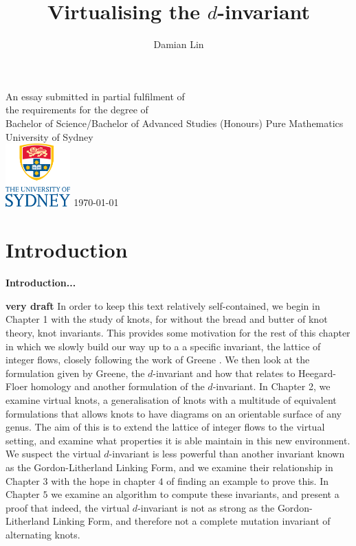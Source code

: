 \documentclass[12pt]{report}
\newcommand{\notered}[1]{{\color{Red} \textbf{#1}}}
\newcommand{\notegreen}[1]{{\color{Green} \textbf{#1}}}
\begin{document}
	

\author{Damian Lin}
\title{Virtualising the $d$-invariant}

\cleardoublepage \thispagestyle{empty}
\null \vfil
\begingroup
\LARGE \bfseries \centering
\openup \medskipamount
\thetitle \par \vspace{30pt}
\centering \mdseries \theauthor \par \bigskip
\endgroup
\vfil \vfil \vfil
\begin{center}
	An essay submitted in partial fulfilment of\\
	the requirements for the degree of\\
	Bachelor of Science/Bachelor of Advanced Studies (Honours)
	\vfil\vfil
	{\large Pure Mathematics\\[5pt]
		University of Sydney}\\
	\vskip6mm
	\includegraphics[width=25mm]{graphics/USY_MB1_CMYK_Stacked_Logo}
	\vfil
	\normalsize\today
\end{center}
\vfil
\cleardoublepage

\tableofcontents

\chapter*{Introduction}

\notegreen{Introduction...}

\notered{very draft}
In order to keep this text relatively self-contained, we begin in Chapter 1 with the study of knots, for without the bread and butter of knot theory, knot invariants. This provides some motivation for the rest of this chapter in which we slowly build our way up to a a specific invariant, the lattice of integer flows, closely following the work of Greene \cite{lattices-graphs-mutation}. We then look at the formulation given by Greene, the $d$-invariant and how that relates to Heegard-Floer homology and another formulation of the $d$-invariant. In Chapter 2, we examine virtual knots, a generalisation of knots with a multitude of equivalent formulations that allows knots to have diagrams on an orientable surface of any genus. The aim of this is to extend the lattice of integer flows to the virtual setting, and examine what properties it is able maintain in this new environment. We suspect the virtual $d$-invariant is less powerful than another invariant known as the Gordon-Litherland Linking Form, and we examine their relationship in Chapter $3$ with the hope in chapter $4$ of finding an example to prove this. In Chapter $5$ we examine an algorithm to compute these invariants, and present a proof that indeed, the virtual $d$-invariant is not as strong as the Gordon-Litherland Linking Form, and therefore not a complete mutation invariant of alternating knots.
\end{document}
